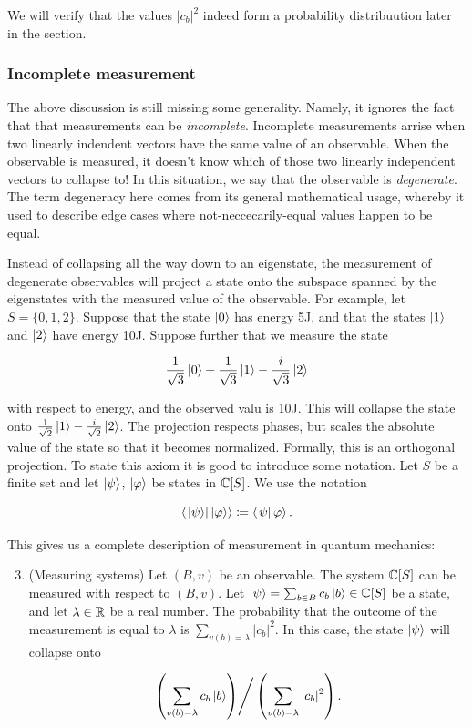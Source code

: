 \documentclass{article}
\theoremstyle{definition}
\numberwithin{figure}{section}
\begin{document}
We will verify that the values $|c_b|^2$ indeed form a probability distribuution later in the section.

\subsubsection{Incomplete measurement}

The above discussion is still missing some generality. Namely, it ignores the fact that that measurements can be \textit{incomplete}. Incomplete measurements arrise when two linearly indendent vectors have the same value of an observable. When the observable is measured, it doesn't know which of those two linearly independent vectors to collapse to! In this situation, we say that the observable is \textit{degenerate}. The term degeneracy here comes from its general mathematical usage, whereby it used to describe edge cases where not-neccecarily-equal values happen to be equal.

Instead of collapsing all the way down to an eigenstate, the measurement of degenerate observables will project a state onto the subspace spanned by the eigenstates with the measured value of the observable. For example, let $S=\{0,1,2\}$. Suppose that the state $\left|0\right>$ has energy 5J, and that the states $\left|1\right>$ and $\ket{2}$ have energy 10J. Suppose further that we measure the state

$$\frac{1}{\sqrt{3}}\left|0\right>+\frac{1}{\sqrt{3}}\left|1\right>-\frac{i}{\sqrt{3}}\ket{2}$$

with respect to energy, and the observed valu is 10J. This will collapse the state onto $\frac{1}{\sqrt{2}}\left|1\right>-\frac{i}{\sqrt{2}}\ket{2}$. The projection respects phases, but scales the absolute value of the state so that it becomes normalized. Formally, this is an orthogonal projection. To state this axiom it is good to introduce some notation. Let $S$ be a finite set and let $\ket{\psi}$, $\ket{\varphi}$ be states in $\mathbb{C}[S]$. We use the notation

$$\left< \left. \ket{\psi} \right| \ket{\varphi}\right>\coloneqq \left< \left. \psi \right| \varphi \right>.$$

This gives us a complete description of measurement in quantum mechanics:

\begin{enumerate}[1''.]
\setcounter{enumi}{2}

\item (Measuring systems) Let $(B,v)$ be an observable. The system $\mathbb{C}[S]$ can be measured with respect to $(B,v)$. Let $\ket{\psi}=\sum_{b\in B}c_b \ket{b}\in \mathbb{C}[S]$ be a state, and let $\lambda\in \mathbb{R}$ be a real number. The probability that the outcome of the measurement is equal to $\lambda$ is $\sum_{v(b)=\lambda}|c_b|^2$. In this case, the state $\ket{\psi}$ will collapse onto

$$\left.\left(\sum_{v(b)=\lambda}c_b \ket{b}\right)\right/ \left(\sum_{v(b)=\lambda}|c_b|^2\right).$$
\end{enumerate}
\end{document}
